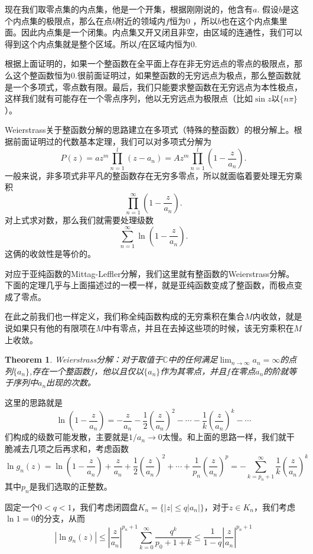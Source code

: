 \documentclass[10pt]{book}
\theoremstyle{plain}%
\newtheorem{theo}{Theorem}[chapter]%
\begin{document}
现在我们取零点集的内点集，他是一个开集，根据刚刚说的，他含有$a$.
假设$b$是这个内点集的极限点，那么在点$b$附近的领域内$f$恒为0 ，所以$b$也在这个内点集里面。因此内点集是一个闭集。内点集又开又闭且非空，由区域的连通性，我们可以得到这个内点集就是整个区域。所以$f$在区域内恒为0.

根据上面证明的，如果一个整函数在全平面上存在非无穷远点的零点的极限点，那么这个整函数恒为0.很前面证明过，如果整函数的无穷远点为极点，那么整函数就是一个多项式，零点数有限。最后，我们只能要求整函数在无穷远点为本性极点，这样我们就有可能存在一个零点序列，他以无穷远点为极限点（比如$\sin z $以$\{n\pi \}$）。

Weierstrass关于整函数分解的思路建立在多项式（特殊的整函数）的根分解上。根据前面证明过的代数基本定理，我们可以对多项式分解为
\[
P(z)=az^m\prod_{n=1}^l(z-a_n)=Az^m\prod_{n=1}^l\left(1-\frac{z}{a_n}\right).
\]
一般来说，非多项式非平凡的整函数存在无穷多零点，所以就面临着要处理无穷乘积
\[
\prod_{n=1}^\infty\left(1-\frac{z}{a_n}\right).
\]
对上式求对数，那么我们就需要处理级数
\[
\sum_{n=1}^\infty\ln \left(1-\frac{z}{a_n}\right).
\]
这俩的收敛性是等价的。

对应于亚纯函数的Mittag-Leffler分解，我们这里就有整函数的Weierstrass分解。下面的定理几乎与上面描述过的一模一样，就是亚纯函数变成了整函数，而极点变成了零点。

在此之前我们也一样定义，我们称全纯函数构成的无穷乘积在集合$M$内收敛，就是说如果只有他的有限项在$M$中有零点，并且在去掉这些项的时候，该无穷乘积在$M$上收敛。
\begin{theo}
Weierstrass分解：对于取值于$\mathbb{C}$中的任何满足$\lim_{n \to \infty} a_n = \infty$的点列$\{a_n\}$,存在一个整函数$f$，他以且仅以$\{a_n\}$作为其零点，并且$f$在零点$a_n$的阶就等于序列中$a_n$出现的次数。
\end{theo}
这里的思路就是\[
\ln \left(1-\frac{z}{a_n}\right)=-\frac{z}{a_n}-\frac{1}{2}\left(\frac{z}{a_n}\right)^2-\cdots-\frac{1}{k}\left(\frac{z}{a_n}\right)^k-\cdots
\]
们构成的级数可能发散，主要就是$1/a_n\to 0$太慢。和上面的思路一样，我们就干脆减去几项之后再求和，考虑函数
\[
\ln g_n(z)=\ln \left(1-\frac{z}{a_n}\right)+\frac{z}{a_n}+\frac{1}{2}\left(\frac{z}{a_n}\right)^2+\cdots+\frac{1}{p_n}\left(\frac{z}{a_n}\right)^p=-\sum_{k=p_n+1}^\infty\frac{1}{k}\left(\frac{z}{a_n}\right)^k
\]
其中$p_n$是我们选取的正整数。

固定一个$0<q<1$，我们考虑闭圆盘$K_n=\{|z|\leq q|a_n|\}$，对于$z \in K_n$，我们考虑$\ln 1 =0$的分支，从而
\[
|\ln g_n(z)|\leq \left|\frac{z}{a_n}\right|^{p_n+1}\sum_{k=0}^\infty\frac{q^k}{p_0+1+k}\leq \frac{1}{1-q}\left|\frac{z}{a_n}\right|^{p_n+1}
\]
\end{document}
